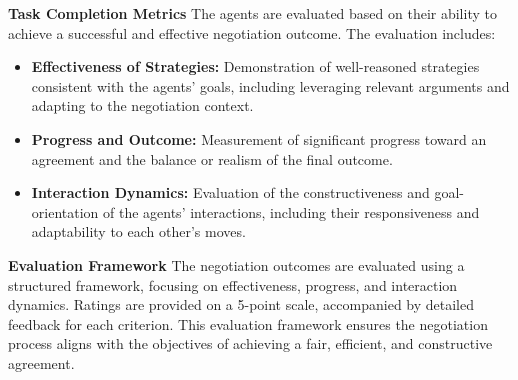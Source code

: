 \begin{table}[htbp]
\centering
{}
\caption{Distribution of Personality Traits in Percentage}
\label{tab:appendix_personality_traits}
\end{table}


\textbf{Task Completion Metrics}
The agents are evaluated based on their ability to achieve a successful and effective negotiation outcome. The evaluation includes:

\begin{itemize}
    \item \textbf{Effectiveness of Strategies:} Demonstration of well-reasoned strategies consistent with the agents' goals, including leveraging relevant arguments and adapting to the negotiation context.
    \item \textbf{Progress and Outcome:} Measurement of significant progress toward an agreement and the balance or realism of the final outcome.
    \item \textbf{Interaction Dynamics:} Evaluation of the constructiveness and goal-orientation of the agents' interactions, including their responsiveness and adaptability to each other's moves.
\end{itemize}

\textbf{Evaluation Framework}
The negotiation outcomes are evaluated using a structured framework, focusing on effectiveness, progress, and interaction dynamics. Ratings are provided on a 5-point scale, accompanied by detailed feedback for each criterion. This evaluation framework ensures the negotiation process aligns with the objectives of achieving a fair, efficient, and constructive agreement.

